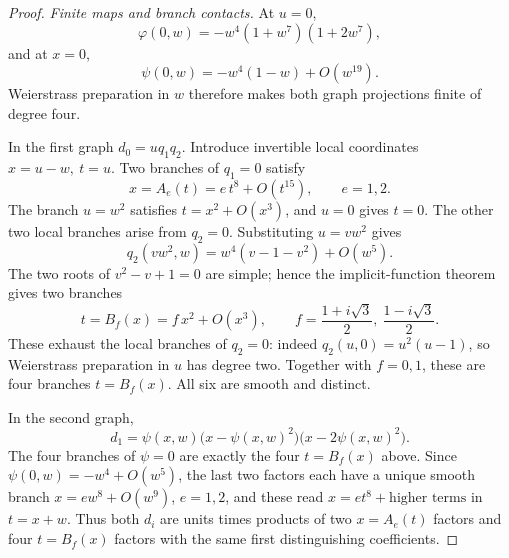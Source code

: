 \begin{proof}
\noindent\emph{Finite maps and branch contacts.}
At \(u=0\),
\[
 \varphi(0,w)=-w^4(1+w^7)(1+2w^7),
\]
and at \(x=0\),
\[
 \psi(0,w)=-w^4(1-w)+O(w^{19}).
\]
Weierstrass preparation in \(w\) therefore makes both graph projections
finite of degree four.

In the first graph \(d_0=u q_1q_2\). Introduce invertible local
coordinates \(x=u-w,\ t=u\). Two branches of \(q_1=0\) satisfy
\[
 x=A_e(t)=e\,t^8+O(t^{15}),\qquad e=1,2.
\]
The branch \(u=w^2\) satisfies \(t=x^2+O(x^3)\), and \(u=0\) gives \(t=0\).
The other two local branches arise from \(q_2=0\). Substituting \(u=vw^2\)
gives
\[
 q_2(vw^2,w)=w^4(v-1-v^2)+O(w^5).
\]
The two roots of \(v^2-v+1=0\) are simple; hence the implicit-function
theorem gives two branches
\[
 t=B_f(x)=f\,x^2+O(x^3),\qquad
 f=\frac{1+i\sqrt3}{2},\ \frac{1-i\sqrt3}{2}.
\]
These exhaust the local branches of \(q_2=0\): indeed
\(q_2(u,0)=u^2(u-1)\), so Weierstrass preparation in \(u\) has degree two.
Together with \(f=0,1\), these are four branches \(t=B_f(x)\).
All six are smooth and distinct.

In the second graph,
\[
 d_1=\psi(x,w)\bigl(x-\psi(x,w)^2\bigr)
                    \bigl(x-2\psi(x,w)^2\bigr).
\]
The four branches of \(\psi=0\) are exactly the four \(t=B_f(x)\)
above. Since \(\psi(0,w)=-w^4+O(w^5)\), the last two factors each have
a unique smooth branch \(x=e w^8+O(w^9)\), \(e=1,2\), and these read
\(x=e t^8+\text{higher terms}\) in \(t=x+w\). Thus both \(d_i\) are units
times products of two \(x=A_e(t)\) factors and four \(t=B_f(x)\) factors
with the same first distinguishing coefficients.


\end{proof}
